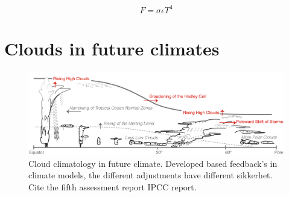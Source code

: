 \begin{equation} \label{eq:stefan-boltzmann}
    F = \sigma \epsilon T ^4
\end{equation}

\section{Clouds in future climates} \label{sec:intro_cloud_future_climates}
\begin{figure}[h]
    \centering
    \includegraphics[scale = 0.8]{Chapter1_Intro/images/Fig7-11_ipcc.jpg}
    \caption{Cloud climatology in future climate. Developed based feedback's in climate models, the different adjustments have different sikkerhet. Cite the fifth assessment report IPCC report.}
    \label{fig:cloud_scheme}
\end{figure}

